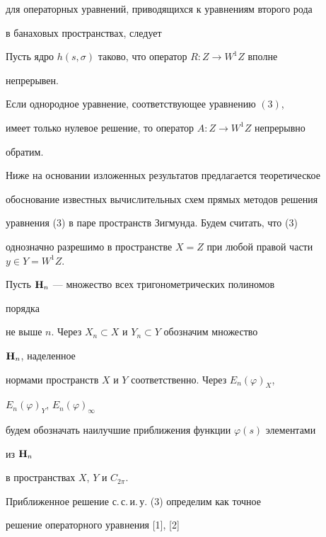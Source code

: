 для операторных уравнений, приводящихся к уравнениям второго рода 


в банаховых пространствах, следует 


 


\begin{thm} 


Пусть ядро $h(s,\sigma)$ таково, что оператор $R:Z\to W^1Z$ вполне 


непрерывен. 


Если однородное уравнение, соответствующее уравнению $(3)$, 


имеет только нулевое решение, то оператор $A:Z\to W^1Z$ непрерывно 


обратим. 


\end{thm} 


 


Ниже на основании изложенных результатов предлагается теоретическое 


обоснование известных вычислительных схем прямых методов решения 


уравнения (3) в паре пространств Зигмунда. Будем считать, что (3) 


однозначно разрешимо в пространстве $X=Z$ при любой правой части $y\in 


Y=W^1Z$. 


 


Пусть $\bold H_n$ --- множество всех тригонометрических полиномов 


порядка 


не выше $n$. Через $X_n\subset X$ и $Y_n\subset Y$ обозначим множество 


$\bold H_n$, наделенное 


нормами пространств $X$ и $Y$ соответственно. Через $E_n(\varphi)_X$, 


$E_n(\varphi)_Y$, $E_n(\varphi)_\infty$ 


будем обозначать наилучшие приближения функции $\varphi(s)$ элементами 


из $\bold H_n$ 


в пространствах $X$, $Y$ и $C_{2\pi}$. 


 


Приближенное решение с.\,с.\,и.\,у. (3) определим как точное 


решение операторного уравнения [1], [2]


